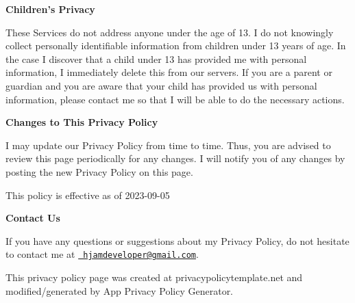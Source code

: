 {\bfseries{Children’s Privacy}}

These Services do not address anyone under the age of 13. I do not knowingly collect personally identifiable information from children under 13 years of age. In the case I discover that a child under 13 has provided me with personal information, I immediately delete this from our servers. If you are a parent or guardian and you are aware that your child has provided us with personal information, please contact me so that I will be able to do the necessary actions.

{\bfseries{Changes to This Privacy Policy}}

I may update our Privacy Policy from time to time. Thus, you are advised to review this page periodically for any changes. I will notify you of any changes by posting the new Privacy Policy on this page.

This policy is effective as of 2023-\/09-\/05

{\bfseries{Contact Us}}

If you have any questions or suggestions about my Privacy Policy, do not hesitate to contact me at \href{mailto:hjamdeveloper@gmail.com}{\texttt{ hjamdeveloper@gmail.\+com}}.

This privacy policy page was created at privacypolicytemplate.\+net and modified/generated by App Privacy Policy Generator. 